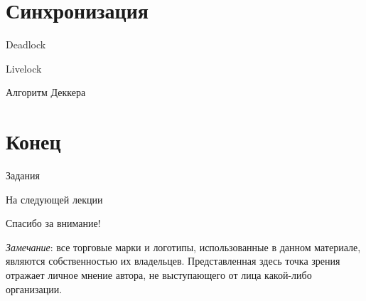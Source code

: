 \section{Синхронизация}

\begin{frame}{Deadlock}
\todo
\end{frame}

\begin{frame}{Livelock}
\todo
\end{frame}

\begin{frame}{Алгоритм Деккера}
\todo
\end{frame}

\section{Конец}

\begin{frame}{Задания}
\end{frame}

\begin{frame}{На следующей лекции}
\end{frame}

\begin{frame}

{\huge{Спасибо за внимание!}\par}

\vfill

\tiny{\textit{Замечание}: все торговые марки и логотипы, использованные в данном материале, являются собственностью их владельцев. Представленная здесь точка зрения отражает личное мнение автора, не выступающего от лица какой-либо организации.}

\end{frame}

